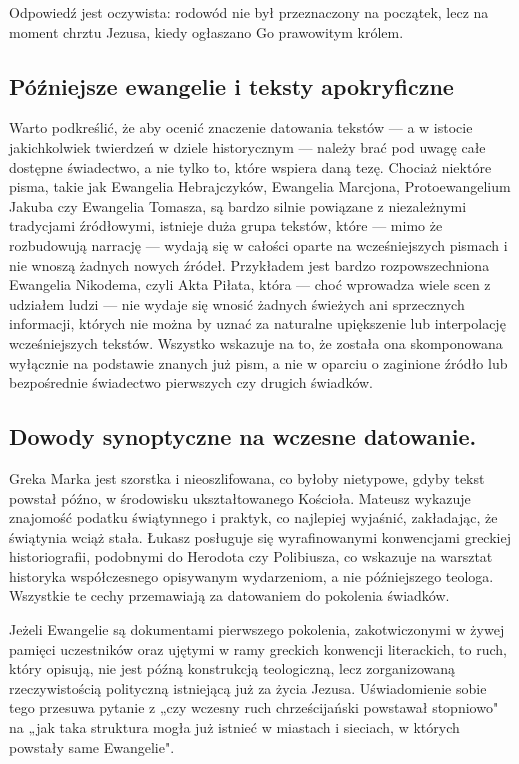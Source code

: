 Odpowiedź jest oczywista: rodowód nie był przeznaczony na początek, lecz na moment chrztu Jezusa, kiedy ogłaszano Go prawowitym królem.

\subsection{Późniejsze ewangelie i teksty apokryficzne}\label{subsec:later-gospels-and-apocryphal-texts}

Warto podkreślić, że aby ocenić znaczenie datowania tekstów — a w istocie jakichkolwiek twierdzeń w dziele historycznym — należy brać pod uwagę całe dostępne świadectwo, a nie tylko to, które wspiera daną tezę.
Chociaż niektóre pisma, takie jak Ewangelia Hebrajczyków, Ewangelia Marcjona, Protoewangelium Jakuba czy Ewangelia Tomasza, są bardzo silnie powiązane z niezależnymi tradycjami źródłowymi, istnieje duża grupa tekstów, które — mimo że rozbudowują narrację — wydają się w całości oparte na wcześniejszych pismach i nie wnoszą żadnych nowych źródeł.
Przykładem jest bardzo rozpowszechniona Ewangelia Nikodema, czyli Akta Piłata, która — choć wprowadza wiele scen z udziałem ludzi — nie wydaje się wnosić żadnych świeżych ani sprzecznych informacji, których nie można by uznać za naturalne upiększenie lub interpolację wcześniejszych tekstów.
Wszystko wskazuje na to, że została ona skomponowana wyłącznie na podstawie znanych już pism, a nie w oparciu o zaginione źródło lub bezpośrednie świadectwo pierwszych czy drugich świadków.

\subsection{Dowody synoptyczne na wczesne datowanie.}\label{subsec:synoptic-evidence-for-early-dating.}

Greka Marka jest szorstka i nieoszlifowana, co byłoby nietypowe, gdyby tekst powstał późno, w środowisku ukształtowanego Kościoła.
Mateusz wykazuje znajomość podatku świątynnego i praktyk, co najlepiej wyjaśnić, zakładając, że świątynia wciąż stała.
Łukasz posługuje się wyrafinowanymi konwencjami greckiej historiografii, podobnymi do Herodota czy Polibiusza, co wskazuje na warsztat historyka współczesnego opisywanym wydarzeniom, a nie późniejszego teologa.
Wszystkie te cechy przemawiają za datowaniem do pokolenia świadków.

Jeżeli Ewangelie są dokumentami pierwszego pokolenia, zakotwiczonymi w żywej pamięci uczestników oraz ujętymi w ramy greckich konwencji literackich, to ruch, który opisują, nie jest późną konstrukcją teologiczną, lecz zorganizowaną rzeczywistością polityczną istniejącą już za życia Jezusa.
Uświadomienie sobie tego przesuwa pytanie z „czy wczesny ruch chrześcijański powstawał stopniowo" na „jak taka struktura mogła już istnieć w miastach i sieciach, w których powstały same Ewangelie".
